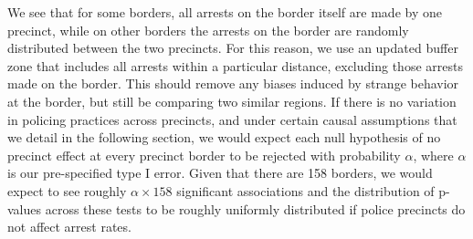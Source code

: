 \documentclass[a4paper,11pt]{article}
\begin{document}
We see that for some borders, all arrests on the border itself are made by one precinct, while on other borders the arrests on the border are randomly distributed between the two precincts. For this reason, we use an updated buffer zone that includes all arrests within a particular distance, excluding those arrests made on the border. This should remove any biases induced by strange behavior at the border, but still be comparing two similar regions. 
If there is no variation in policing practices across precincts, and under certain causal assumptions that we detail in the following section, we would expect each null hypothesis of no precinct effect at every precinct border to be rejected with probability $\alpha$, where $\alpha$ is our pre-specified type I error. Given that there are 158 borders, we would expect to see roughly $\alpha \times 158$ significant associations and the distribution of p-values across these tests to be roughly uniformly distributed if police precincts do not affect arrest rates. 
\end{document}
